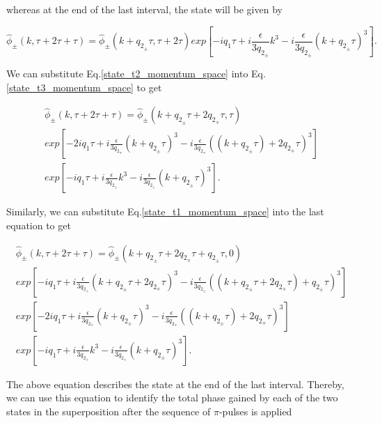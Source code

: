 \documentclass{article}
\begin{document}
whereas at the end of the last interval, the state will be given by

\begin{equation}\label{state_t3_momentum_space}
\widehat{\phi}_{\pm}(k, \tau+2\tau+\tau) = \widehat{\phi}_{\pm}(k + q_{2_{\pm}}\tau, \tau+2\tau) exp\left[-i q_{1} \tau + i \frac{\epsilon}{3q_{2_{\pm}}} k^{3} - i \frac{\epsilon}{3q_{2_{\pm}}} (k + q_{2_{\pm}} \tau)^{3} \right].
\end{equation}

We can substitute Eq.\ref{state_t2_momentum_space} into Eq.\ref{state_t3_momentum_space} to get

\begin{multline}\label{state_t3_momentum_space_2}
\widehat{\phi}_{\pm}(k, \tau+2\tau+\tau) = \widehat{\phi}_{\pm}(k + q_{2_{\pm}}\tau + 2q_{2_{\mp}}\tau, \tau)  \\ 
exp\left[-2i q_{1} \tau + i \frac{\epsilon}{3q_{2_{\mp}}} (k+q_{2_{\pm}}\tau)^{3} - i \frac{\epsilon}{3q_{2_{\mp}}} ((k+ q_{2_{\pm}}\tau) + 2q_{2_{\mp}} \tau)^{3} \right] \\
exp\left[-i q_{1} \tau + i \frac{\epsilon}{3q_{2_{\pm}}} k^{3} - i \frac{\epsilon}{3q_{2_{\pm}}} (k + q_{2_{\pm}} \tau)^{3} \right].
\end{multline}

Similarly, we can substitute Eq.\ref{state_t1_momentum_space} into the last equation to get

\begin{multline}\label{state_t3_momentum_space_final}
\widehat{\phi}_{\pm}(k, \tau+2\tau+\tau) = \widehat{\phi}_{\pm}(k + q_{2_{\pm}}\tau + 2q_{2_{\mp}}\tau + q_{2_{\pm}}\tau , 0) \\ 
exp\left[-i q_{1} \tau + i \frac{\epsilon}{3q_{2_{\pm}}} (k+ q_{2_{\pm}}\tau + 2q_{2_{\mp}}\tau)^{3} - i \frac{\epsilon}{3q_{2_{\pm}}} ((k+q_{2_{\pm}}\tau + 2q_{2_{\mp}}\tau) + q_{2_{\pm}} \tau)^{3} \right] \\
exp\left[-2i q_{1} \tau + i \frac{\epsilon}{3q_{2_{\mp}}} (k+q_{2_{\pm}}\tau)^{3} - i \frac{\epsilon}{3q_{2_{\mp}}} ((k+ q_{2_{\pm}}\tau) + 2q_{2_{\mp}} \tau)^{3} \right] \\
exp\left[-i q_{1} \tau + i \frac{\epsilon}{3q_{2_{\pm}}} k^{3} - i \frac{\epsilon}{3q_{2_{\pm}}} (k + q_{2_{\pm}} \tau)^{3} \right].
\end{multline}

The above equation describes the state at the end of the last interval. Thereby, we can use this equation to identify the total phase gained by each of the two states in the superposition after the sequence of $\pi$-pulses is applied
\end{document}
